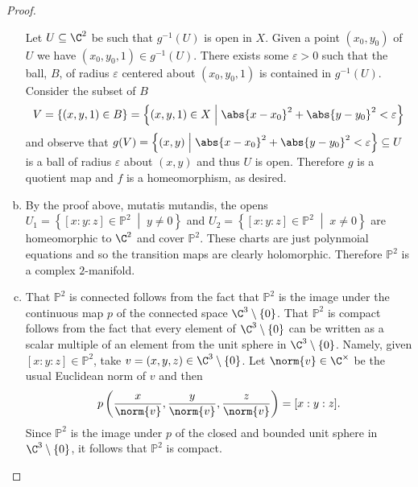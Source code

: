 \documentclass[10pt]{amsart}
\begin{document}
\begin{thm}
\begin{proof}
\begin{enumerate}[(a)]
      Let $U \subseteq \C^2$ be such that $g^{-1}(U)$ is open in $X$.
      Given a point $(x_0,y_0)$ of $U$ we have $(x_0, y_0, 1) \in g^{-1}(U)$.
      There exists some $\varepsilon > 0$ such that the ball, $B$, of radius $\varepsilon$ centered about $(x_0,y_0,1)$ is contained in $g^{-1}(U)$.
      Consider the subset of $B$ 
      $$V = \left\{(x,y,1) \in B\right\} = \left\{(x, y, 1) \in X \;\middle\vert\; \abs{x - x_0}^2 + \abs{y - y_0}^2 < \varepsilon \right\}$$
      and observe that $g(V) = \left\{(x,y) \;\middle\vert\; \abs{x - x_0}^2 + \abs{y-y_0}^2 < \varepsilon \right\} \subseteq U$ is a ball of radius $\varepsilon$ about $(x,y)$ and thus $U$ is open.
      Therefore $g$ is a quotient map and $f$ is a homeomorphism, as desired.
    \item
      By the proof above, mutatis mutandis, the opens $U_1 = \left\{ [x : y : z] \in \mathbb{P}^2 \;\middle\vert\; y \neq 0 \right\}$ and $U_2 = \left\{ [x : y : z] \in \mathbb{P}^2 \;\middle\vert\; x \neq 0 \right\}$ are homeomorphic to $\C^2$ and cover $\mathbb{P}^2$.
      These charts are just polynmoial equations and so the transition maps are clearly holomorphic.
      Therefore $\mathbb{P}^2$ is a complex $2$-manifold.
    \item
      That $\mathbb{P}^2$ is connected follows from the fact that $\mathbb{P}^2$ is the image under the continuous map $p$ of the connected space $\C^3 \setminus \{0\}$.
      That $\mathbb{P}^2$ is compact follows from the fact that every element of $\C^3\setminus\{0\}$ can be written as a scalar multiple of an element from the unit sphere in $\C^3\setminus\{0\}$.
      Namely, given $[x : y : z] \in \mathbb{P}^2$, take $v = (x, y, z) \in \C^3\setminus\{0\}$.
      Let $\norm{v} \in \C^\times$ be the usual Euclidean norm of $v$ and then 
      $$p\left(\frac{x}{\norm{v}}, \frac{y}{\norm{v}}, \frac{z}{\norm{v}}\right) = [x : y : z].$$
      Since $\mathbb{P}^2$ is the image under $p$ of the closed and bounded unit sphere in $\C^3\setminus\{0\}$, it follows that $\mathbb{P}^2$ is compact.
    \end{enumerate}
  \end{proof}
\end{thm}
\end{document}
